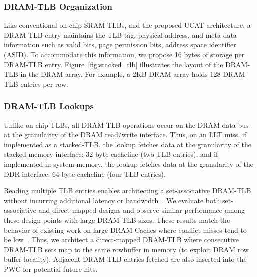 
\subsubsection{DRAM-TLB Organization}

\noindent Like conventional on-chip SRAM TLBs, and the proposed UCAT
architecture, a DRAM-TLB entry maintains the TLB tag, physical
address, and meta data information such as valid bits, page permission
bits, address space identifier (ASID). To accommodate this
information, we propose 16 bytes of storage per DRAM-TLB entry.
Figure~\ref{fig:stacked_tlb} illustrates the layout of the DRAM-TLB in
the DRAM array. For example, a 2KB DRAM array holds 128 DRAM-TLB
entries per row. 

\subsubsection{DRAM-TLB Lookups}

\noindent Unlike on-chip TLBs, all DRAM-TLB operations occur on the
DRAM data bus at the granularity of the DRAM read/write interface.
Thus, on an LLT miss, if implemented as a stacked-TLB, the lookup
fetches data at the granularity of the stacked memory interface:
32-byte cacheline (two TLB entries), and if implemented in system
memory, the lookup fetches data at the granularity of the DDR
interface: 64-byte cacheline (four TLB entries).

Reading multiple
TLB entries enables architecting a set-associative DRAM-TLB without
incurring additional latency or bandwidth~\cite{moin2012,loh2011}. 
We evaluate both set-associative and direct-mapped
designs and observe similar performance among these design points with large DRAM-TLB sizes. These
results match the behavior of existing work on large DRAM Caches where
conflict misses tend to be low~\cite{moin2012}. Thus, we architect a
direct-mapped DRAM-TLB where consecutive DRAM-TLB sets map to the same
rowbuffer in memory (to exploit DRAM row buffer locality). Adjacent
DRAM-TLB entries fetched are also inserted into the PWC for potential
future hits.

